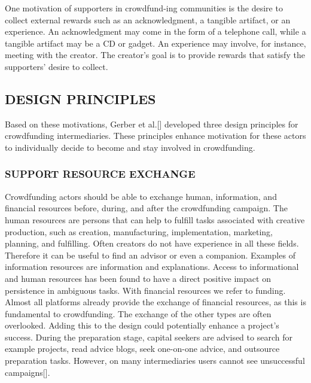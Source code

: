 One motivation of supporters in crowdfund-ing communities is the desire to collect external rewards such as an acknowledgment, a tangible artifact, or an experience. An acknowledgment may come in the form of a telephone call, while a tangible artifact may be a CD or gadget. An experience may involve, for instance, meeting with the creator. The creator’s goal is to provide rewards that satisfy the supporters’ desire to collect.

\subsection{DESIGN PRINCIPLES}
Based on these motivations, Gerber et al.[\cite{crowdMotiv}] developed three design principles for crowdfunding
intermediaries. These principles enhance motivation for these actors to individually decide to become and
stay involved in crowdfunding.
\subsubsection*{SUPPORT RESOURCE EXCHANGE}
Crowdfunding actors should be able to exchange human, information, and financial resources before, during, and after the crowdfunding campaign. The human resources are persons that can help to fulfill tasks
associated with creative production, such as creation, manufacturing, implementation, marketing, planning,
and fulfilling. Often creators do not have experience in all these fields. Therefore it can be useful to find
an advisor or even a companion. Examples of information resources are information and explanations. Access to informational and human resources has been found to have a direct positive impact on persistence
in ambiguous tasks. With financial resources we refer to funding. Almost all platforms already provide the
exchange of financial resources, as this is fundamental to crowdfunding. The exchange of the other types are
often overlooked. Adding this to the design could potentially enhance a project’s success.
During the preparation stage, capital seekers are advised to search for example projects, read advice blogs,
seek one-on-one advice, and outsource preparation tasks. However, on many intermediaries users cannot
see unsuccessful campaigns[\cite{10.1145/2531602.2531715}].
